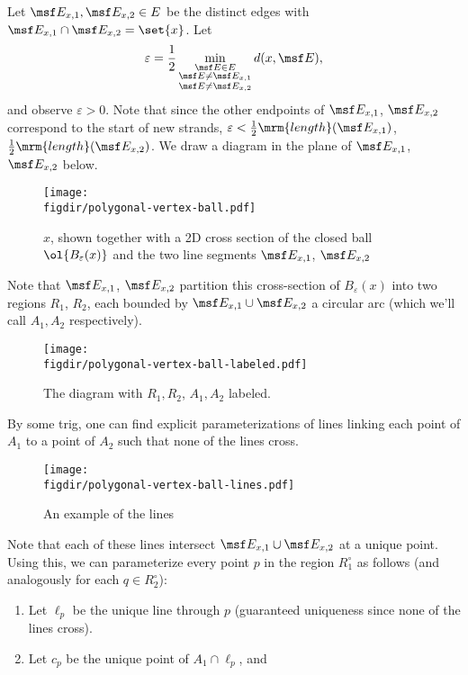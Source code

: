 \begin{sproof}
\begin{enumerate}[label=\arabic*)]
      Let $\msf E_{x,1}, \msf E_{x,2} \in E$ be the distinct edges
      with $\msf E_{x,1} \cap \msf E_{x,2}= \set{x}$. Let
      \[
      \varepsilon = \frac{1}{2} \min_{\substack{\msf E \in E \\ \msf E
      \neq \msf E_{x,1} \\ \msf E \neq \msf E_{x, 2}}} d(x, \msf E),
      \]
      and observe $\varepsilon > 0$. Note that since the other
      endpoints of $\msf E_{x,1}$, $\msf E_{x,2}$ correspond to the
      start of new strands, $\varepsilon <
      \frac{1}{2}\mrm{length}(\msf E_{x,1})$,
      $\frac{1}{2}\mrm{length}(\msf E_{x,2})$. We draw a diagram in
      the plane of $\msf E_{x,1}$, $\msf E_{x,2}$ below.
      \begin{figure}[H]
        \centering
        \texttt{[image: \\figdir/polygonal-vertex-ball.pdf]}
        \caption{$x$, shown together with a 2D cross section of the
          closed ball $\ol{B_\varepsilon(x)}$ and the two line
          segments $\msf E_{x,1}$, $\msf E_{x,2}$}
      \end{figure}
      Note that $\msf E_{x,1}$, $\msf E_{x,2}$ partition this
      cross-section of $B_\varepsilon(x)$ into two regions $R_1$,
      $R_2$, each bounded by $\msf E_{x,1} \cup \msf E_{x,2}$ a
      circular arc (which we'll call $A_1, A_2$ respectively).
      \begin{figure}[H]
        \centering
        \texttt{[image: \\figdir/polygonal-vertex-ball-labeled.pdf]}
        \caption{The diagram with $R_1, R_2$, $A_1, A_2$ labeled.}
      \end{figure}
      By some trig, one can find explicit parameterizations of lines
      linking each point of $A_1$ to a point of $A_2$ such that none
      of the lines cross.
      \begin{figure}[H]
        \centering
        \texttt{[image: \\figdir/polygonal-vertex-ball-lines.pdf]}
        \caption{An example of the lines}
      \end{figure}
      Note that each of these lines intersect $\msf E_{x,1} \cup \msf
      E_{x,2}$ at a unique point. Using this, we can parameterize
      every point $p$ in the region $R_1^\circ$ as follows (and
      analogously for each $q \in R_2^\circ$):
      \begin{enumerate}
        \item Let $\ell_p$ be the unique line through $p$ (guaranteed
          uniqueness since none of the lines cross).
        \item Let $c_p$ be the unique point of $A_1 \cap \ell_p$, and

\end{enumerate}
\end{enumerate}
\end{sproof}
